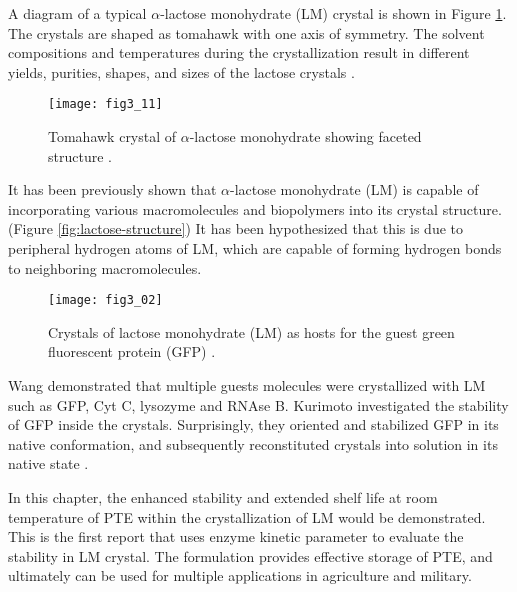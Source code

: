 \begin{refsection}
A diagram of a typical $\alpha$-lactose monohydrate (LM) crystal is shown in
Figure \ref{fig:lm-crystal}. The crystals are shaped as tomahawk with one
axis of symmetry. The solvent compositions and temperatures during the
crystallization result in different yields, purities, shapes, and sizes of the
lactose crystals \cite{Hourigan2013}.
\begin{figure}[h!] \centering \texttt{[image: fig3\_11]}
    \caption[Tomahawk crystal of $\alpha$-lactose monohydrate showing faceted
    structure.]{Tomahawk crystal of $\alpha$-lactose monohydrate showing
        faceted structure \cite{Wong2014}.} 
    \label{fig:lm-crystal} 
\end{figure}

It has been previously shown that $\alpha$-lactose monohydrate (LM) is capable
of incorporating various macromolecules and biopolymers into its crystal
structure\cite{Wang2001a,Kurimoto1999}. (Figure \ref{fig:lactose-structure}) It
has been hypothesized that this is due to peripheral hydrogen atoms of LM,
which are capable of forming hydrogen bonds to neighboring macromolecules.
\begin{figure}[h!] \centering \texttt{[image: fig3\_02]} 
    \caption[Crystals of lactose monohydrate (LM) as hosts for the guest green
    fluorescent protein (GFP)]{Crystals of lactose monohydrate (LM) as hosts
        for the guest green fluorescent protein (GFP) \cite{Wang2001a}.}
    \label{fig:lm-intro}
\end{figure}

Wang  demonstrated that multiple guests molecules were
crystallized with LM \cite{Wang2001a} such as GFP, Cyt C, lysozyme and RNAse B.
Kurimoto  investigated the stability of GFP inside the crystals.
Surprisingly, they oriented and stabilized GFP in its native conformation, and
subsequently reconstituted crystals into solution in its native state
\cite{Kurimoto1999}.

In this chapter, the enhanced stability and extended shelf life at room
temperature of PTE within the crystallization of LM would be demonstrated. This
is the first report that uses enzyme kinetic parameter to evaluate the
stability in LM crystal. The formulation provides effective storage of PTE, and
ultimately can be used for multiple applications in agriculture and military. 


\end{refsection}
